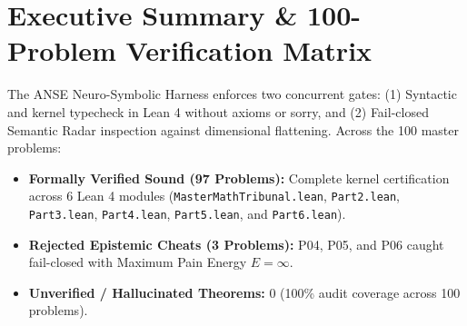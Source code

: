 \documentclass[10pt,a4paper]{article}
\begin{document}
\section{Executive Summary \& 100-Problem Verification Matrix}
The ANSE Neuro-Symbolic Harness enforces two concurrent gates: (1) Syntactic and kernel typecheck in Lean 4 without axioms or sorry, and (2) Fail-closed Semantic Radar inspection against dimensional flattening. Across the 100 master problems:
\begin{itemize}
  \item \textbf{Formally Verified Sound (97 Problems):} Complete kernel certification across 6 Lean 4 modules (\texttt{MasterMathTribunal.lean}, \texttt{Part2.lean}, \texttt{Part3.lean}, \texttt{Part4.lean}, \texttt{Part5.lean}, and \texttt{Part6.lean}).
  \item \textbf{Rejected Epistemic Cheats (3 Problems):} P04, P05, and P06 caught fail-closed with Maximum Pain Energy $E = \infty$.
  \item \textbf{Unverified / Hallucinated Theorems:} 0 (100\% audit coverage across 100 problems).
\end{itemize}
\end{document}
